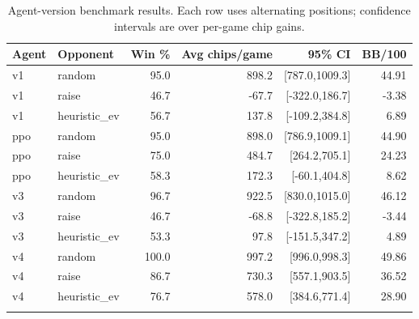 \begin{table}[t]
\centering
\small
\begin{tabular}{llrrrr}
\toprule
Agent & Opponent & Win \% & Avg chips/game & 95\% CI & BB/100 \\
\midrule
v1 & random & 95.0 & 898.2 & [787.0,1009.3] & 44.91 \\
v1 & raise & 46.7 & -67.7 & [-322.0,186.7] & -3.38 \\
v1 & heuristic\_ev & 56.7 & 137.8 & [-109.2,384.8] & 6.89 \\
\addlinespace
ppo & random & 95.0 & 898.0 & [786.9,1009.1] & 44.90 \\
ppo & raise & 75.0 & 484.7 & [264.2,705.1] & 24.23 \\
ppo & heuristic\_ev & 58.3 & 172.3 & [-60.1,404.8] & 8.62 \\
\addlinespace
v3 & random & 96.7 & 922.5 & [830.0,1015.0] & 46.12 \\
v3 & raise & 46.7 & -68.8 & [-322.8,185.2] & -3.44 \\
v3 & heuristic\_ev & 53.3 & 97.8 & [-151.5,347.2] & 4.89 \\
\addlinespace
v4 & random & 100.0 & 997.2 & [996.0,998.3] & 49.86 \\
v4 & raise & 86.7 & 730.3 & [557.1,903.5] & 36.52 \\
v4 & heuristic\_ev & 76.7 & 578.0 & [384.6,771.4] & 28.90 \\
\addlinespace
\bottomrule
\end{tabular}
\caption{Agent-version benchmark results. Each row uses alternating positions; confidence intervals are over per-game chip gains.}
\label{tab:agent_versions}
\end{table}

